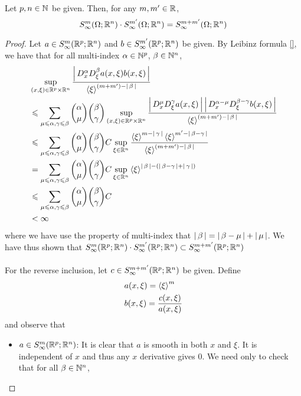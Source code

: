 \documentclass[12pt]{article}
\begin{document}
\begin{fprop}
    Let $p, n \in \N$ be given.  Then, for any $m, m' \in \R$, 
    \[
    S^{m}_\infty(\Omega; \R^n) \cdot S^{m'}_\infty(\Omega; \R^n) = S^{m + m'}_\infty(\Omega; \R^n)
    \]
\end{fprop}
\begin{proof}
    Let $a \in S^{m}_\infty(\R^p; \R^n)$ and $b \in S^{m'}_\infty(\R^p; \R^n)$ be given. By Leibinz formula \ref{}, we have that for all multi-index $\alpha \in \N^p$, $\beta \in \N^n$, 
    \begin{align*}
        & \sup_{(x, \xi) \in \R^p \times \R^n} \frac{\abs{D^\alpha_x D^\beta_\xi a(x, \xi)b(x, \xi)}}{\sym[\xi]^{(m + m') - \abs{\beta}}} \\
        &\leq  \sum_{\mu \leq \alpha, \gamma \leq \beta} \binom{\alpha}{\mu} \binom{\beta}{\gamma} \sup_{(x, \xi) \in \R^p \times \R^n} \frac{\abs{D^\mu_x D^\gamma_\xi a(x, \xi)} \abs{D^{\alpha - \mu}_x D^{\beta - \gamma}_\xi b(x, \xi)}}{\sym[\xi]^{(m + m') - \abs{\beta}}} \\
        &\leq \sum_{\mu \leq \alpha, \gamma \leq \beta} \binom{\alpha}{\mu} \binom{\beta}{\gamma} C \sup_{\xi \in \R^n} \frac{\sym[\xi]^{m - \abs{\gamma}} \sym[\xi]^{m' - \abs{\beta - \gamma}}}{\sym[\xi]^{(m + m') - \abs{\beta}}} \\
        &= \sum_{\mu \leq \alpha, \gamma \leq \beta} \binom{\alpha}{\mu} \binom{\beta}{\gamma} C \sup_{\xi \in \R^n} \sym[\xi]^{\abs{\beta} - (\abs{\beta - \gamma} + \abs{\gamma})} \\
        & \leq \sum_{\mu \leq \alpha, \gamma \leq \beta} \binom{\alpha}{\mu} \binom{\beta}{\gamma} C \\
        &< \infty
    \end{align*}
    where we have use the property of multi-index that $\abs{\beta} = \abs{\beta - \mu} + \abs{\mu}$.  We have thus shown that $S^{m}_\infty(\R^p; \R^n) \cdot S^{m'}_\infty(\R^p; \R^n) \subset S^{m + m'}_\infty(\R^p; \R^n)$\\
    \\
    For the reverse inclusion, let $c \in S^{m + m'}_\infty(\R^p; \R^n)$ be given. Define 
    \begin{align*}
        &a(x, \xi) = \sym[\xi]^m\\
        &b(x, \xi) = \frac{c(x, \xi)}{a(x, \xi)}
    \end{align*}
    and observe that 
    \begin{itemize}
        \item $a \in S^{m}_\infty(\R^p; \R^n)$:  It is clear that $a$ is smooth in both $x$ and $\xi$. It is independent of $x$ and thus any $x$ derivative gives 0. We need only to check that for all $\beta \in \N^n$, 

\end{itemize}
\end{proof}
\end{document}
